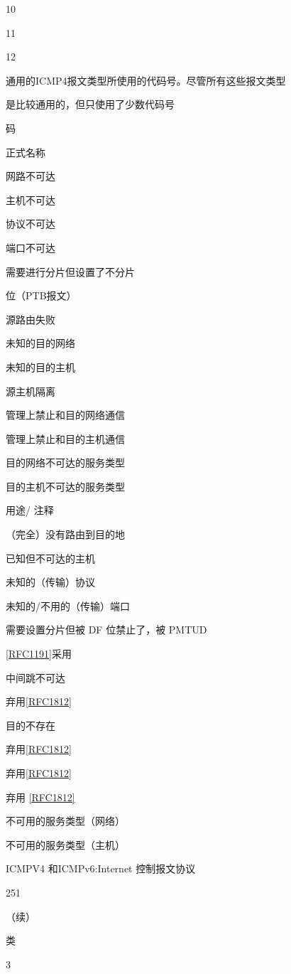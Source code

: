 10

11

12

通用的ICMP4报文类型所使用的代码号。尽管所有这些报文类型

是比较通用的，但只使用了少数代码号

码

正式名称

网路不可达

主机不可达

协议不可达

端口不可达

需要进行分片但设置了不分片

位（PTB报文）

源路由失败

未知的目的网络

未知的目的主机

源主机隔离

管理上禁止和目的网络通信

管理上禁止和目的主机通信

目的网络不可达的服务类型

目的主机不可达的服务类型

用途/ 注释

（完全）没有路由到目的地

已知但不可达的主机

未知的（传输）协议

未知的/不用的（传输）端口

需要设置分片但被 DF 位禁止了，被 PMTUD

\href{https://www.rfc-editor.org/rfc/rfc1191}{[RFC1191]}采用

中间跳不可达

弃用\href{https://www.rfc-editor.org/rfc/rfc1812}{[RFC1812]}

目的不存在

弃用\href{https://www.rfc-editor.org/rfc/rfc1812}{[RFC1812]}

弃用\href{https://www.rfc-editor.org/rfc/rfc1812}{[RFC1812]}

弃用 \href{https://www.rfc-editor.org/rfc/rfc1812}{[RFC1812]}

不可用的服务类型（网络）

不可用的服务类型（主机）

ICMPV4 和ICMPv6:Internet 控制报文协议

251

（续）

类

3

